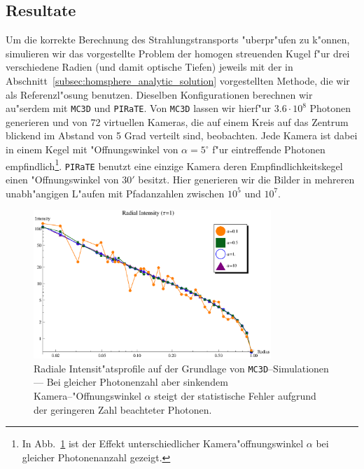 	\subsection{Resultate}
	Um die korrekte Berechnung des Strahlungstransports "uberpr"ufen zu k"onnen, simulieren wir das vorgestellte Problem der homogen streuenden Kugel f"ur drei verschiedene Radien (und damit optische Tiefen) jeweils mit der in Abschnitt~\ref{subsec:homsphere_analytic_solution} vorgestellten Methode, die wir als Referenzl"osung benutzen. Dieselben Konfigurationen berechnen wir au"serdem mit \texttt{MC3D} und \texttt{PIRaTE}. Von \texttt{MC3D} lassen wir hierf"ur $3.6\cdot10^8$ Photonen generieren und von 72 virtuellen Kameras, die auf einem Kreis auf das Zentrum blickend im Abstand von 5 Grad verteilt sind, beobachten. Jede Kamera ist dabei in einem Kegel mit "Offnungswinkel von $\alpha=5^\circ$ f"ur eintreffende Photonen empfindlich\footnote{In Abb.~\ref{fig:alphacomparison} ist der Effekt unterschiedlicher Kamera"offnungswinkel $\alpha$ bei gleicher Photonenanzahl gezeigt.}. \texttt{PIRaTE} benutzt eine einzige Kamera deren Empfindlichkeitskegel einen "Offnungswinkel von $30'$ besitzt. Hier generieren wir die Bilder in mehreren unabh"angigen L"aufen mit Pfadanzahlen zwischen $10^5$ und $10^7$.
	
		\begin{figure}
			\centering
			\includegraphics[width=0.8\textwidth]{mc3dalphasplot.eps}
			\caption{Radiale Intensit"atsprofile auf der Grundlage von \texttt{MC3D}--Simulationen --- Bei gleicher Photonenzahl aber sinkendem Kamera--"Offnungswinkel $\alpha$ steigt der statistische Fehler aufgrund der geringeren Zahl beachteter Photonen.}
			\label{fig:alphacomparison}
		\end{figure}
		
